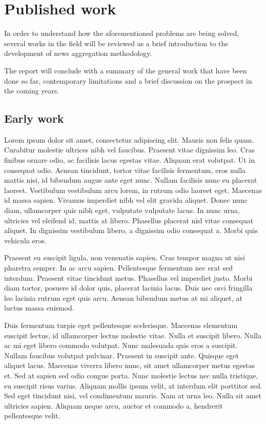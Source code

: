 \documentclass[english]{tktltiki}
\begin{document}
\pagebreak

\section{Published work}

In order to understand how the aforementioned problems are being solved, several works in the field will be reviewed as a brief introduction to the development of news aggregation methodology.

The report will conclude with a summary of the general work that have been done so far, contemporary limitations and a brief discussion on the prospect in the coming years.

\subsection{Early work}


Lorem ipsum dolor sit amet, consectetur adipiscing elit. Mauris non felis quam. Curabitur molestie ultrices nibh vel faucibus. Praesent vitae dignissim leo. Cras finibus ornare odio, ac facilisis lacus egestas vitae. Aliquam erat volutpat. Ut in consequat odio. Aenean tincidunt, tortor vitae facilisis fermentum, eros nulla mattis nisi, id bibendum augue ante eget nunc. Nullam facilisis nunc eu placerat laoreet. Vestibulum vestibulum arcu lorem, in rutrum odio laoreet eget. Maecenas id massa sapien. Vivamus imperdiet nibh vel elit gravida aliquet. Donec nunc diam, ullamcorper quis nibh eget, vulputate vulputate lacus. In nunc urna, ultricies vel eleifend id, mattis at libero. Phasellus placerat nisl vitae consequat aliquet. In dignissim vestibulum libero, a dignissim odio consequat a. Morbi quis vehicula eros.\cite{Yangarber2017GroupingBN, INT:INT1022}

Praesent eu suscipit ligula, non venenatis sapien. Cras tempor magna ut nisi pharetra semper. In ac arcu sapien. Pellentesque fermentum nec erat sed interdum. Praesent vitae tincidunt metus. Phasellus vel imperdiet justo. Morbi diam tortor, posuere id dolor quis, placerat lacinia lacus. Duis nec orci fringilla leo lacinia rutrum eget quis arcu. Aenean bibendum metus at mi aliquet, at luctus massa euismod.

Duis fermentum turpis eget pellentesque scelerisque. Maecenas elementum suscipit lectus, id ullamcorper lectus molestie vitae. Nulla et suscipit libero. Nulla ac mi eget libero commodo volutpat. Nunc malesuada quis eros a suscipit. Nullam faucibus volutpat pulvinar. Praesent in suscipit ante. Quisque eget aliquet lacus. Maecenas viverra libero nunc, sit amet ullamcorper metus egestas et. Sed at sapien sed odio congue porta. Nunc molestie lectus nec nulla tristique, eu suscipit risus varius. Aliquam mollis ipsum velit, at interdum elit porttitor sed. Sed eget tincidunt nisi, vel condimentum mauris. Nam at urna leo. Nulla sit amet ultricies sapien. Aliquam neque arcu, auctor et commodo a, hendrerit pellentesque velit.
\end{document}
